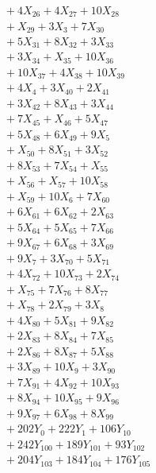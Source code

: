 \documentclass[a4paper,10pt]{article}
\begin{document}
{\begin{align}
&\quad  + 4X_{26} + 4X_{27} + 10X_{28} \\[0.5ex]
&\quad  + X_{29} + 3X_{3} + 7X_{30} \\[0.5ex]
&\quad  + 5X_{31} + 8X_{32} + 3X_{33} \\[0.5ex]
&\quad  + 3X_{34} + X_{35} + 10X_{36} \\[0.5ex]
&\quad  + 10X_{37} + 4X_{38} + 10X_{39} \\[0.5ex]
&\quad  + 4X_{4} + 3X_{40} + 2X_{41} \\[0.5ex]
&\quad  + 3X_{42} + 8X_{43} + 3X_{44} \\[0.5ex]
&\quad  + 7X_{45} + X_{46} + 5X_{47} \\[0.5ex]
&\quad  + 5X_{48} + 6X_{49} + 9X_{5} \\[0.5ex]
&\quad  + X_{50} + 8X_{51} + 3X_{52} \\[0.5ex]
&\quad  + 8X_{53} + 7X_{54} + X_{55} \\[0.5ex]
&\quad  + X_{56} + X_{57} + 10X_{58} \\[0.5ex]
&\quad  + X_{59} + 10X_{6} + 7X_{60} \\[0.5ex]
&\quad  + 6X_{61} + 6X_{62} + 2X_{63} \\[0.5ex]
&\quad  + 5X_{64} + 5X_{65} + 7X_{66} \\[0.5ex]
&\quad  + 9X_{67} + 6X_{68} + 3X_{69} \\[0.5ex]
&\quad  + 9X_{7} + 3X_{70} + 5X_{71} \\[0.5ex]
&\quad  + 4X_{72} + 10X_{73} + 2X_{74} \\[0.5ex]
&\quad  + X_{75} + 7X_{76} + 8X_{77} \\[0.5ex]
&\quad  + X_{78} + 2X_{79} + 3X_{8} \\[0.5ex]
&\quad  + 4X_{80} + 5X_{81} + 9X_{82} \\[0.5ex]
&\quad  + 2X_{83} + 8X_{84} + 7X_{85} \\[0.5ex]
&\quad  + 2X_{86} + 8X_{87} + 5X_{88} \\[0.5ex]
&\quad  + 3X_{89} + 10X_{9} + 3X_{90} \\[0.5ex]
&\quad  + 7X_{91} + 4X_{92} + 10X_{93} \\[0.5ex]
&\quad  + 8X_{94} + 10X_{95} + 9X_{96} \\[0.5ex]
&\quad  + 9X_{97} + 6X_{98} + 8X_{99} \\[0.5ex]
&\quad  + 202Y_{0} + 222Y_{1} + 106Y_{10} \\[0.5ex]
&\quad  + 242Y_{100} + 189Y_{101} + 93Y_{102} \\[0.5ex]
&\quad  + 204Y_{103} + 184Y_{104} + 176Y_{105} \\[0.5ex]

\end{align}}
\end{document}
